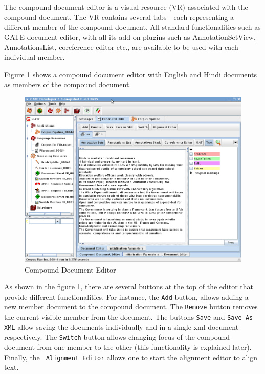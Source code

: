 The compound document editor is a visual resource (VR) associated with
the compound document. The VR contains several tabs - each
representing a different member of the compound document.  All
standard functionalities such as GATE document editor, with all its
add-on plugins such as AnnotationSetView, AnnotationsList,
coreference editor etc., are available to be used with each individual
member.

Figure \ref{fig:compound-document-editor} shows a compound document
editor with English and Hindi documents as members of the compound
document.

\begin{figure}[ht]
\begin{center}
\includegraphics[width=\textwidth]{compound-document-editor.png}
\caption{Compound Document Editor}
\label{fig:compound-document-editor}
\end{center}
\end{figure}

As shown in the figure \ref{fig:compound-document-editor}, there are several
buttons at the top of the editor that provide different functionalities.  For
instance, the {\tt Add} button, allows adding a new member document to the
compound document. The {\tt Remove} button removes the current visible member 
from the document.  The buttons {\tt Save} and {\tt Save As XML} allow saving 
the documents individually and in a single xml document respectively.  The
{\tt Switch} button allows changing focus of the compound document from one
member to the other (this functionality is explained later). Finally, the {\tt
Alignment Editor} allows one to start the alignment editor to align text.

